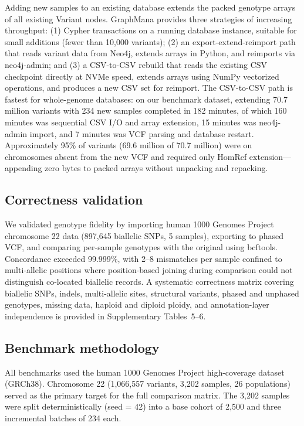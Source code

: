 \documentclass[pdflatex,sn-nature]{sn-jnl}
\begin{document}
Adding new samples to an existing database extends the packed genotype arrays of all existing Variant nodes. GraphMana provides three strategies of increasing throughput: (1) Cypher transactions on a running database instance, suitable for small additions (fewer than 10,000 variants); (2) an export-extend-reimport path that reads variant data from Neo4j, extends arrays in Python, and reimports via neo4j-admin; and (3) a CSV-to-CSV rebuild that reads the existing CSV checkpoint directly at NVMe speed, extends arrays using NumPy vectorized operations, and produces a new CSV set for reimport. The CSV-to-CSV path is fastest for whole-genome databases: on our benchmark dataset, extending 70.7 million variants with 234 new samples completed in 182 minutes, of which 160 minutes was sequential CSV I/O and array extension, 15 minutes was neo4j-admin import, and 7 minutes was VCF parsing and database restart. Approximately 95\% of variants (69.6 million of 70.7 million) were on chromosomes absent from the new VCF and required only HomRef extension---appending zero bytes to packed arrays without unpacking and repacking.

\subsection*{Correctness validation}

We validated genotype fidelity by importing human 1000 Genomes Project chromosome 22 data (897,645 biallelic SNPs, 5 samples), exporting to phased VCF, and comparing per-sample genotypes with the original using bcftools. Concordance exceeded 99.999\%, with 2--8 mismatches per sample confined to multi-allelic positions where position-based joining during comparison could not distinguish co-located biallelic records. A systematic correctness matrix covering biallelic SNPs, indels, multi-allelic sites, structural variants, phased and unphased genotypes, missing data, haploid and diploid ploidy, and annotation-layer independence is provided in Supplementary Tables~5--6.

\subsection*{Benchmark methodology}

All benchmarks used the human 1000 Genomes Project high-coverage dataset~\cite{byrska2022} (GRCh38). Chromosome 22 (1,066,557 variants, 3,202 samples, 26 populations) served as the primary target for the full comparison matrix. The 3,202 samples were split deterministically (seed = 42) into a base cohort of 2,500 and three incremental batches of 234 each.
\end{document}
